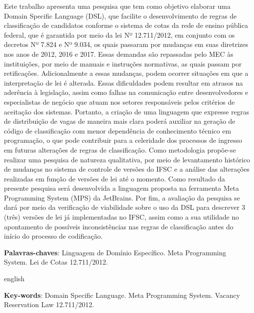 
\begin{resumo}[Resumo] \noindent 
Este trabalho apresenta uma pesquisa que tem como objetivo elaborar uma Domain Specific Language (DSL), que facilite o desenvolvimento de regras de classificação de candidatos conforme o sistema de cotas da rede de ensino pública federal, que é garantida por meio da lei Nº 12.711/2012, em conjunto com os decretos Nº 7.824 e Nº 9.034, os quais passaram por mudanças em suas diretrizes nos anos de 2012, 2016 e 2017. Essas demandas são repassadas pelo \gls{MEC} às instituições, por meio de manuais e instruções normativas, as quais passam por retificações. Adicionalmente a essas mudanças, podem ocorrer situações em que a interpretação de lei é alterada. Essas dificuldades podem resultar em atrasos na aderência à legislação, assim como falhas na comunicação entre desenvolvedores e especialistas de negócio que atuam nos setores responsáveis pelos critérios de aceitação dos sistemas. Portanto, a criação de uma linguagem que expresse regras de distribuição de vagas de maneira mais clara poderá auxiliar na geração de código de classificação com menor dependência de conhecimento técnico em programação, o que pode contribuir para a celeridade dos processos de ingresso em futuras alterações de regras de classificação. Como metodologia propõe-se realizar uma pesquisa de natureza qualitativa, por meio de levantamento histórico de mudanças no sistema de controle de versões do \gls{IFSC} e a análise das alterações realizadas em função de versões de lei até o momento. Como resultado da presente pesquisa será desenvolvida a linguagem proposta na ferramenta Meta Programming System (MPS) da JetBrains. Por fim, a avaliação da pesquisa se dará por meio da verificação de viabilidade sobre o uso da DSL para descrever 3 (três) versões de lei já implementadas no IFSC, assim como a sua utilidade no apontamento de possíveis inconsistências nas regras de classificação antes do início do processo de codificação.

 \vspace{\onelineskip}
    
 \noindent
 \textbf{Palavras-chaves}: Linguagem de Domínio Específico. Meta Programming System. Lei de Cotas 12.711/2012.
\end{resumo}



\begin{resumo}[Abstract]
 \begin{otherlanguage*}{english}

\lipsum[5]

   \vspace{\onelineskip}
 
   \noindent 
   \textbf{Key-words}: Domain Specific Language. Meta Programming System. Vacancy Reservation Law 12.711/2012.
 \end{otherlanguage*}
\end{resumo}
